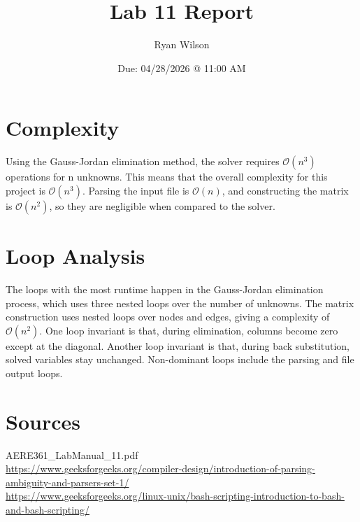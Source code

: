 \documentclass{article}
\title{Lab 11 Report}
\date{Due: 04/28/2026 @ 11:00 AM}
\author{Ryan Wilson}
\begin{document}
\maketitle
\newpage

\section{Complexity}

Using the Gauss-Jordan elimination method, the solver requires $\mathcal{O}(n^3)$ operations for n unknowns. This means that the overall complexity for this project is $\mathcal{O}(n^3)$. Parsing the input file is $\mathcal{O}(n)$, and constructing the matrix is $\mathcal{O}(n^2)$, so they are negligible when compared to the solver.

\section{Loop Analysis}

The loops with the most runtime happen in the Gauss-Jordan elimination process, which uses three nested loops over the number of unknowns. The matrix construction uses nested loops over nodes and edges, giving a complexity of $\mathcal{O}(n^2)$. One loop invariant is that, during elimination, columns become zero except at the diagonal. Another loop invariant is that, during back substitution, solved variables stay unchanged. Non-dominant loops include the parsing and file output loops.

\section{Sources}
AERE361\_LabManual\_11.pdf\\
\url{https://www.geeksforgeeks.org/compiler-design/introduction-of-parsing-ambiguity-and-parsers-set-1/}\\
\url{https://www.geeksforgeeks.org/linux-unix/bash-scripting-introduction-to-bash-and-bash-scripting/}\\
\end{document}
